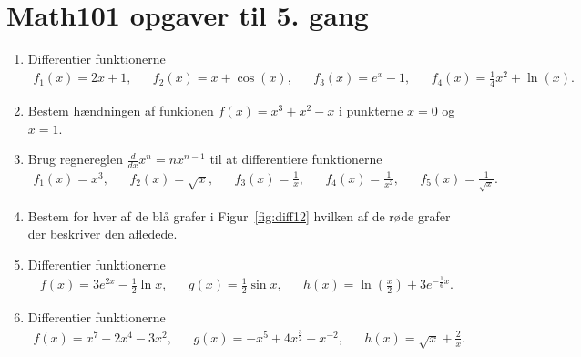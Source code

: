 \newpage
\section{Math101 opgaver til 5. gang}
\begin{enumerate}
	\item Differentier funktionerne 
	\begin{align*}
	f_1(x)=2x+1,&& f_2(x)=x+\cos(x),&& f_3(x)=e^x-1,&&f_4(x)=\frac{1}{4}x^2+\ln(x).
	\end{align*}
	
	
	\item Bestem hændningen af funkionen $f(x)=x^3+x^2-x$ i punkterne $x=0$ og $x=1$.

	\item Brug regnereglen $\frac{d}{dx} x^n=nx^{n-1}$ til at differentiere funktionerne
	\begin{align*}
	f_1(x)=x^3,&& f_2(x)=\sqrt{x},&& f_3(x)=\frac{1}{x},&&f_4(x)=\frac{1}{x^2},&&f_5(x)=\frac{1}{\sqrt{x}}.
	\end{align*}
	\item \label{it:diff12} Bestem for hver af de blå grafer i Figur~\ref{fig:diff12} hvilken af de røde grafer der beskriver den afledede.
	
	\item Differentier funktionerne 
	\begin{align*}
	f(x)=3e^{2x}-\frac{1}{2}\ln x,&& g(x)=\frac{1}{2}\sin x,&& h(x)=\ln(\frac{x}{2})+3e^{-\frac{1}{6}x}.
	\end{align*}
	
	\item Differentier funktionerne
	\begin{align*}
	f(x)=x^7-2x^4-3x^2,&&g(x)=-x^5+4x^{\frac{3}{2}}-x^{-2},&&h(x)=\sqrt{x}+\frac{2}{x}.
	\end{align*}
	
	\begin{figure}
		\centering
		

\end{figure}
\end{enumerate}
